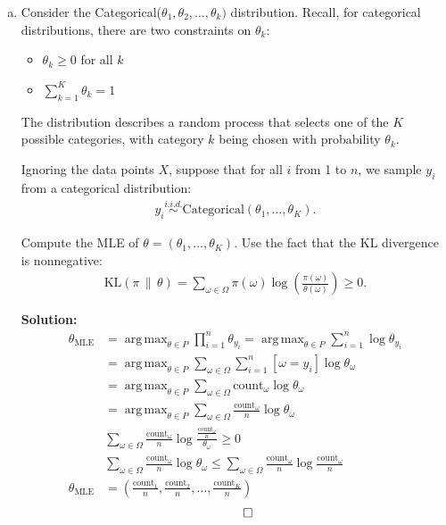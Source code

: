\documentclass{article}
\DeclareMathOperator*{\argmax}{arg\,max}
\newenvironment{solution}{\color{blue} \smallskip \textbf{Solution:}}{}
\begin{document}
\begin{enumerate}[(a)]
    \newpage
    \item %
    Consider the Categorical($\theta_{1}, \theta_{2}, \ldots, \theta_{k})$ distribution. Recall, for categorical distributions, there are two constraints on $\theta_{k}$:
    \begin{itemize}
        \item $\theta_{k} \geq 0$ for all $k$
        \item $\sum_{k = 1}^{K} \theta_{k} = 1$
    \end{itemize}
    The distribution describes a random process that selects one of the $K$ possible categories, with category $k$ being chosen with probability $\theta_{k}$.

    Ignoring the data points $X$, suppose that for all $i$ from 1 to $n$, we sample $y_{i}$ from a categorical distribution:
    \begin{align*}
        y_i \stackrel{i.i.d.}{\sim} \mathrm{Categorical}(\theta_1,\ldots, \theta_K).
    \end{align*}

    Compute the MLE of $\theta = (\theta_1,\ldots, \theta_K)$. Use the fact that the KL divergence is nonnegative: 
    \begin{align*}
        \mathrm{KL}(\pi\,\|\, \theta) = \sum_{\omega\in\Omega} \pi(\omega)\log\left(\frac{\pi(\omega)}{\theta(\omega)}\right)\geq 0.
    \end{align*}

    \begin{solution}
        \begin{align*}
            \theta_{\text{MLE}} &= \argmax_{\theta \in P} \prod_{i=1}^{n} \theta_{y_i} 
            = \argmax_{\theta \in P} \sum_{i=1}^n \log \theta_{y_i} \\
            &= \argmax_{\theta \in P} \sum_{\omega \in \Omega} \sum_{i=1}^n [\omega = y_i] \log \theta_\omega \\
            &= \argmax_{\theta \in P} \sum_{\omega \in \Omega} \text{count}_{\omega} \log \theta_\omega \\
            &= \argmax_{\theta \in P} \sum_{\omega \in \Omega} \frac{\text{count}_{\omega}}{n} \log \theta_\omega \\
            &\sum_{\omega \in \Omega} \frac{\text{count}_{\omega}}{n} \log \frac{\frac{\text{count}_{\omega}}{n}}{\theta_\omega} \geq 0 \\
            &\sum_{\omega \in \Omega} \frac{\text{count}_{\omega}}{n} \log \theta_\omega \leq 
            \sum_{\omega \in \Omega} \frac{\text{count}_{\omega}}{n} \log \frac{\text{count}_{\omega}}{n} \\
            \theta_{\text{MLE}} &= \left( \frac{\text{count}_1}{n}, \frac{\text{count}_2}{n}, \dots, \frac{\text{count}_K}{n} \right)
        \end{align*}
        \[ \qedhere \]
    \end{solution}


\end{enumerate}
\end{document}
